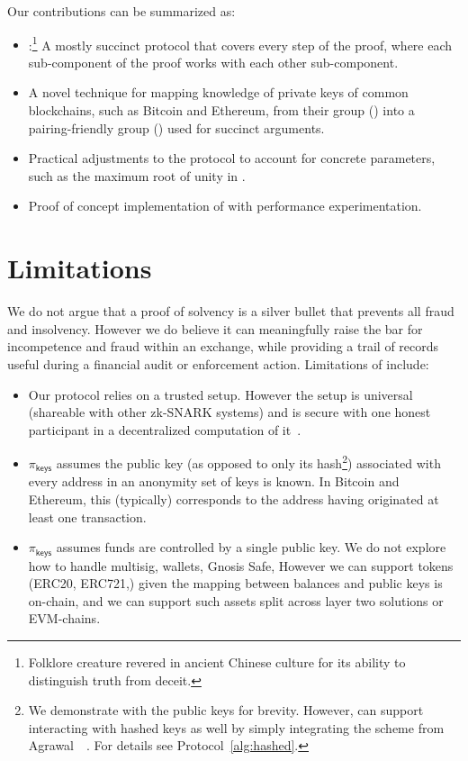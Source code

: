 Our contributions can be summarized as:

\begin{itemize}
\item \Sys:\footnote{Folklore creature revered in ancient Chinese culture for its ability to distinguish truth from deceit.} A mostly succinct protocol that covers every step of the proof, where each sub-component of the proof works with each other sub-component.
\item A novel technique for mapping knowledge of private keys of common blockchains, such as Bitcoin and Ethereum, from their group (\secp) into a pairing-friendly group (\bls) used for succinct arguments.
\item Practical adjustments to the protocol to account for concrete parameters, such as the maximum root of unity in \bls. 
\item Proof of concept implementation of \Sys with performance experimentation.
\end{itemize}


\section{Limitations}

We do not argue that a proof of solvency is a silver bullet that prevents all fraud and insolvency. However we do believe it can meaningfully raise the bar for incompetence and fraud within an exchange, while providing a trail of records useful during a financial audit or enforcement action. Limitations of \Sys include: 

\begin{itemize}
\item Our protocol relies on a trusted setup. However the setup is universal (shareable with other zk-SNARK systems) and is secure with one honest participant in a decentralized computation of it~\cite{tau}.
\item $\pi_\mathsf{keys}$ assumes the public key (as opposed to only its hash\footnote{We demonstrate \Sys with the public keys for brevity. However, \Sys can support interacting with hashed keys as well by simply integrating the scheme from Agrawal~\etal~\cite{composite}. For details see Protocol~\ref{alg:hashed}.}) associated with every address in an anonymity set of keys is known. In Bitcoin and Ethereum, this (typically) corresponds to the address having originated at least one transaction.
\item $\pi_\mathsf{keys}$ assumes funds are controlled by a single public key. We do not explore how to handle multisig, wallets, Gnosis Safe, \etc However we can support tokens (\eg ERC20, ERC721,\etc) given the mapping between balances and public keys is on-chain, and we can support such assets split across layer two solutions or EVM-chains. 
\end{itemize}

